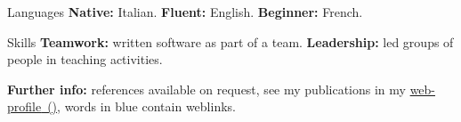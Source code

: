 
\begin{cvskills}

\cvskill
{Languages}
{\textbf{Native:} Italian. \textbf{Fluent:} English. \textbf{Beginner:} French.}

\cvskill
{Skills}
{\textbf{Teamwork:} written software as part of a team. \textbf{Leadership:} 
led groups of people in teaching activities.}

\end{cvskills}

\vspace{-1mm}
\flushleft
\footnotesize
\item {\color{awesome-red}\textbf{Fur}}{\color{awesome-darknight}\textbf{ther 
info:}} references available on request, see my publications in my 
{\href{https://www.ncl.ac.uk/engineering/staff/profile/alessandrode-gennaro.html}{{\color{myblue}web-profile}~(\profLogo\hspace{-0.8mm})}},
words in {\color{myblue}blue} contain weblinks.